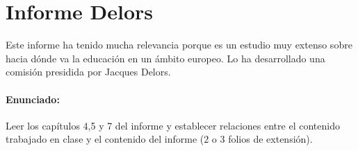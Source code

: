 
\section{Informe Delors}

Este informe ha tenido mucha relevancia porque es un estudio muy extenso sobre hacia dónde va la educación en un ámbito europeo.
%
Lo ha desarrollado una comisión presidida por Jacques Delors.


\paragraph{Enunciado:} Leer los capítulos 4,5 y 7 del informe y establecer relaciones entre el contenido trabajado en clase y el contenido del informe (2 o 3 folios de extensión).


